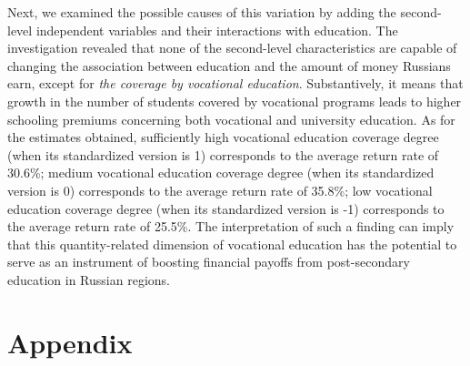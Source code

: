 \documentclass[12pt,a4paper]{article}
\numberwithin{equation}{section}
\begin{document}
Next, we examined the possible causes of this variation by adding the second-level independent variables and their interactions with education. The investigation revealed that none of the second-level characteristics are capable of changing the association between education and the amount of money Russians earn, except for \textit{the coverage by vocational education}. Substantively, it means that growth in the number of students covered by vocational programs leads to higher schooling premiums concerning both vocational and university education. As for the estimates obtained, sufficiently high vocational education coverage degree (when its standardized version is 1) corresponds to the average return rate of 30.6\%; medium vocational education coverage degree (when its standardized version is 0) corresponds to the average return rate of 35.8\%; low vocational education coverage degree (when its standardized version is -1) corresponds to the average return rate of 25.5\%. The interpretation of such a finding can imply that this quantity-related dimension of vocational education has the potential to serve as an instrument of boosting financial payoffs from post-secondary education in Russian regions. 


\printbibliography

\newpage
\section*{Appendix}
%

\setcounter{table}{0}
\renewcommand{\thetable}{A\arabic{table}}
\end{document}

